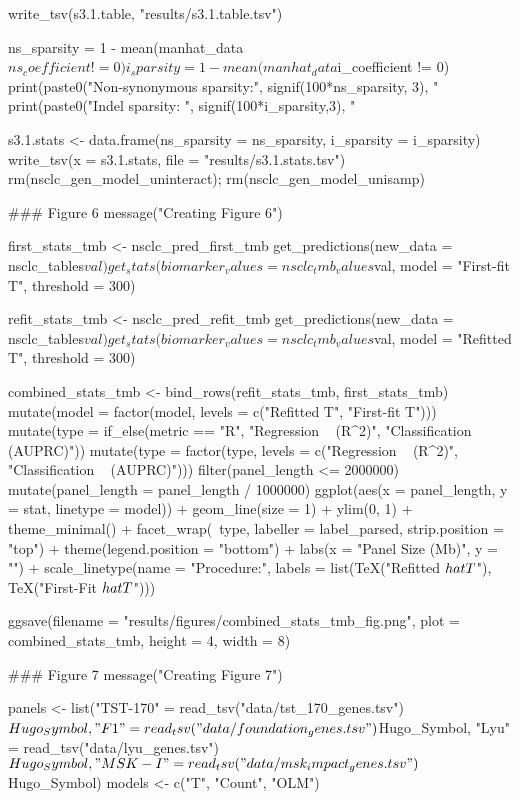 {write_tsv(s3.1.table, "results/s3.1.table.tsv")

ns_sparsity = 1 - mean(manhat_data$ns_coefficient != 0)
i_sparsity = 1 - mean(manhat_data$i_coefficient != 0)
print(paste0("Non-synonymous sparsity:", signif(100*ns_sparsity, 3), "%
print(paste0("Indel sparsity: ", signif(100*i_sparsity,3), "%

s3.1.stats <- data.frame(ns_sparsity = ns_sparsity,
                         i_sparsity = i_sparsity)
write_tsv(x = s3.1.stats, file = "results/s3.1.stats.tsv")
rm(nsclc_gen_model_uninteract); rm(nsclc_gen_model_unisamp)


### Figure 6
message("Creating Figure 6")

first_stats_tmb <- nsclc_pred_first_tmb %
  get_predictions(new_data = nsclc_tables$val) %
  get_stats(biomarker_values = nsclc_tmb_values$val, model = "First-fit T", threshold = 300)

refit_stats_tmb <- nsclc_pred_refit_tmb %
  get_predictions(new_data = nsclc_tables$val) %
  get_stats(biomarker_values = nsclc_tmb_values$val, model = "Refitted T", threshold = 300)

combined_stats_tmb <- bind_rows(refit_stats_tmb, first_stats_tmb) %
  mutate(model = factor(model, levels = c("Refitted T", "First-fit T"))) %
  mutate(type = if_else(metric == "R", "Regression ~ (R^2)", "Classification ~ (AUPRC)")) %
  mutate(type = factor(type, levels = c("Regression ~ (R^2)", "Classification ~ (AUPRC)"))) %
  filter(panel_length <= 2000000) %
  mutate(panel_length = panel_length / 1000000) %
  ggplot(aes(x = panel_length, y = stat, linetype = model)) + geom_line(size = 1) + ylim(0, 1) +
  theme_minimal() + facet_wrap(~type, labeller = label_parsed, strip.position = "top") +
  theme(legend.position = "bottom") + labs(x = "Panel Size (Mb)", y = "") +
  scale_linetype(name = "Procedure:", labels = list(TeX("Refitted $\\hat{T}$"), TeX("First-Fit $\\hat{T}$"))) 

ggsave(filename = "results/figures/combined_stats_tmb_fig.png", plot = combined_stats_tmb, height = 4, width = 8)



### Figure 7
message("Creating Figure 7")



panels <- list("TST-170" = read_tsv("data/tst_170_genes.tsv")$Hugo_Symbol,
               "F1" = read_tsv("data/foundation_genes.tsv")$Hugo_Symbol,
               "Lyu" = read_tsv("data/lyu_genes.tsv")$Hugo_Symbol,
               "MSK-I" = read_tsv("data/msk_impact_genes.tsv")$Hugo_Symbol)
models <- c("T", "Count", "OLM")

}

